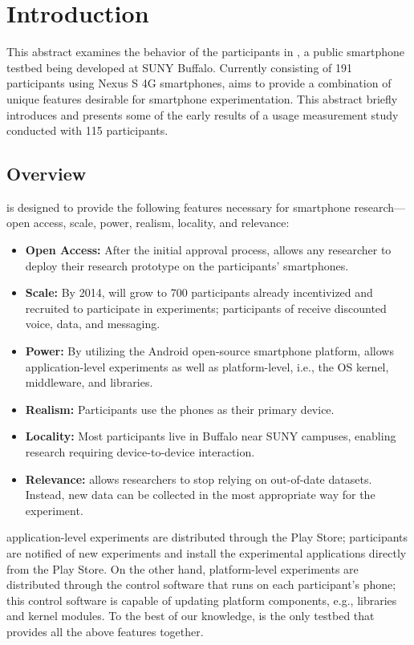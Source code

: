 \section{Introduction}
\label{sec-introduction}

This abstract examines the behavior of the participants in \PhoneLab{}, a public
smartphone testbed being developed at SUNY Buffalo. Currently consisting of 191
participants using Nexus S 4G smartphones, \PhoneLab{} aims to provide a
combination of unique features desirable for smartphone experimentation. This
abstract briefly introduces \PhoneLab{} and presents some of the early results
of a usage measurement study conducted with 115 participants. 

\subsection{\PhoneLab{} Overview}

\PhoneLab{} is designed to provide the following features necessary for
smartphone research---open access, scale, power, realism, locality, and
relevance:

\begin{itemize}
\itemsep -2pt
\item {\bf Open Access:} After the initial approval process, \PhoneLab{} allows
any researcher to deploy their research prototype on the participants'
smartphones.
\item {\bf Scale:} By 2014, \PhoneLab{} will grow to 700 participants already
incentivized and recruited to participate in experiments; participants of
\PhoneLab{} receive discounted voice, data, and messaging.
\item {\bf Power:} By utilizing the Android open-source smartphone platform,
\PhoneLab{} allows application-level experiments as well as platform-level,
i.e., the OS kernel, middleware, and libraries.
\item {\bf Realism:} Participants use the phones as their primary device.
\item {\bf Locality:} Most participants live in Buffalo near SUNY campuses,
enabling research requiring device-to-device interaction.
\item {\bf Relevance:} \PhoneLab{} allows researchers to stop relying on
out-of-date datasets. Instead, new data can be collected in the most
appropriate way for the experiment.
\end{itemize}

\PhoneLab{} application-level experiments are distributed through the Play
Store; participants are notified of new experiments and install the experimental
applications directly from the Play Store. On the other hand, \PhoneLab{}
platform-level experiments are distributed through the \PhoneLab{} control
software that runs on each participant's phone; this control software is capable
of updating platform components, e.g., libraries and kernel modules. To the best
of our knowledge, \PhoneLab{} is the only testbed that provides all the above
features together.


